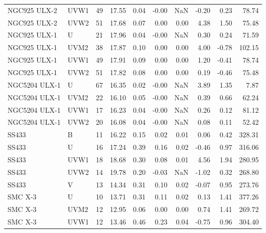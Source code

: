 \begin{tabular}{llrrrrrrrr}
      NGC925 ULX-2 &   UVW1 &     49 & 17.55 & 0.04 &     -0.00 &    NaN &     -0.20 &  0.23 &        78.74 \\
      NGC925 ULX-2 &   UVW2 &     51 & 17.68 & 0.07 &      0.00 &   0.00 &      4.38 &  1.50 &        75.48 \\
      NGC925 ULX-1 &      U &     21 & 17.96 & 0.04 &     -0.00 &    NaN &      0.30 &  0.24 &        71.59 \\
      NGC925 ULX-1 &   UVM2 &     38 & 17.87 & 0.10 &      0.00 &   0.00 &      4.00 & -0.78 &       102.15 \\
      NGC925 ULX-1 &   UVW1 &     49 & 17.91 & 0.09 &      0.00 &   0.00 &      1.20 & -0.41 &        78.74 \\
      NGC925 ULX-1 &   UVW2 &     51 & 17.82 & 0.08 &      0.00 &   0.00 &      0.19 & -0.46 &        75.48 \\
     NGC5204 ULX-1 &      U &     67 & 16.35 & 0.02 &     -0.00 &    NaN &      3.89 &  1.35 &         7.87 \\
     NGC5204 ULX-1 &   UVM2 &     22 & 16.10 & 0.05 &     -0.00 &    NaN &      0.39 &  0.66 &        62.24 \\
     NGC5204 ULX-1 &   UVW1 &     17 & 16.23 & 0.04 &     -0.00 &    NaN &      0.26 &  0.12 &        81.12 \\
     NGC5204 ULX-1 &   UVW2 &     20 & 16.08 & 0.04 &     -0.00 &    NaN &      0.08 &  0.11 &        52.42 \\
             SS433 &      B &     11 & 16.22 & 0.15 &      0.02 &   0.01 &      0.06 &  0.42 &       328.31 \\
             SS433 &      U &     16 & 17.24 & 0.39 &      0.16 &   0.02 &     -0.46 &  0.97 &       316.06 \\
             SS433 &   UVW1 &     18 & 18.68 & 0.30 &      0.08 &   0.01 &      4.56 &  1.94 &       280.95 \\
             SS433 &   UVW2 &     14 & 19.78 & 0.20 &     -0.03 &    NaN &     -1.02 &  0.32 &       268.80 \\
             SS433 &      V &     13 & 14.34 & 0.31 &      0.10 &   0.02 &     -0.07 &  0.95 &       273.76 \\
           SMC X-3 &      U &     10 & 13.71 & 0.31 &      0.11 &   0.02 &      0.13 &  1.41 &       377.26 \\
           SMC X-3 &   UVM2 &     12 & 12.95 & 0.06 &      0.00 &   0.00 &      0.74 &  1.41 &       269.72 \\
           SMC X-3 &   UVW1 &     12 & 13.46 & 0.46 &      0.23 &   0.04 &     -0.75 &  0.96 &       304.40 \\

\end{tabular}

